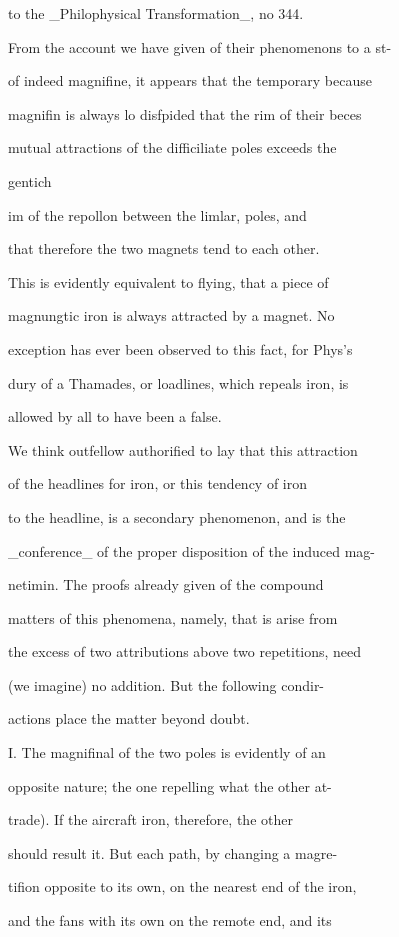 \documentclass{article}
\begin{document}
to the \_Philophysical Transformation\_, no 344.

From the account we have given of their phenomenons to a st-

of indeed magnifine, it appears that the temporary because

magnifin is always lo disfpided that the rim of their beces

mutual attractions of the difficiliate poles exceeds the

gentich

im of the repollon between the limlar, poles, and

that therefore the two magnets tend to each other.

This is evidently equivalent to flying, that a piece of

magnungtic iron is always attracted by a magnet. No

exception has ever been observed to this fact, for Phys's

dury of a Thamades, or loadlines, which repeals iron, is

allowed by all to have been a false.

We think outfellow authorified to lay that this attraction

of the headlines for iron, or this tendency of iron

to the headline, is a secondary phenomenon, and is the

\_conference\_ of the proper disposition of the induced mag-

netimin. The proofs already given of the compound

matters of this phenomena, namely, that is arise from

the excess of two attributions above two repetitions, need

(we imagine) no addition. But the following condir-

actions place the matter beyond doubt.

I. The magnifinal of the two poles is evidently of an

opposite nature; the one repelling what the other at-

trade). If the aircraft iron, therefore, the other

should result it. But each path, by changing a magre-

tifion opposite to its own, on the nearest end of the iron,

and the fans with its own on the remote end, and its
\end{document}
